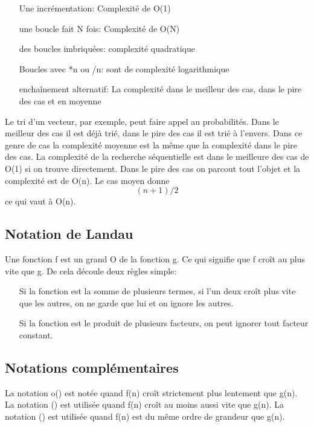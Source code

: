 \documentclass{article}
\begin{document}
\begin{itemize}
	\item[Une incrémentation:]Complexité de O(1)
	\item[une boucle fait N fois:] Complexité de O(N)
    	\item[des boucles imbriquées:] complexité quadratique 
	\item[Boucles avec *n ou /n:] sont de complexité logarithmique
	\item[enchaînement alternatif:] La complexité dans le meilleur des cas, dans le pire des cas et en moyenne
\end{itemize}
\bigskip
Le tri d'un vecteur, par exemple, peut faire appel au probabilités. Dans le meilleur des cas il est déjà trié, dans le pire des cas il est trié à l'envers. Dans ce genre de cas la complexité moyenne est la même que la complexité dans le pire des cas. 
La complexité de la recherche séquentielle est dans le meilleure des cas de O(1) si on trouve directement. Dans le pire des cas on parcout tout l'objet et la complexité est de O(n). Le cas moyen donne $$ (n+1)/2 $$ ce qui vaut à O(n). 

\subsection{Notation de Landau}
Une fonction f est un grand O de la fonction g. Ce qui signifie que f croît au plus vite que g. De cela découle deux règles simple:
\begin{itemize}
	\item[Si la fonction est la somme de plusieurs termes, si l'un deux croît plus vite que les autres, on ne garde que lui et on ignore les autres.]
	\item[Si la fonction est le produit de plusieurs facteurs, on peut ignorer tout facteur constant.]
\end{itemize}
\subsection{Notations complémentaires}
La notation o() est notée quand f(n) croît strictement plus lentement que g(n). La notation \Omega() est utilisée quand f(n) croît au moins aussi vite que g(n). La notation \Theta() est utilisée quand f(n) est du même ordre de grandeur que g(n). 
\end{document}

